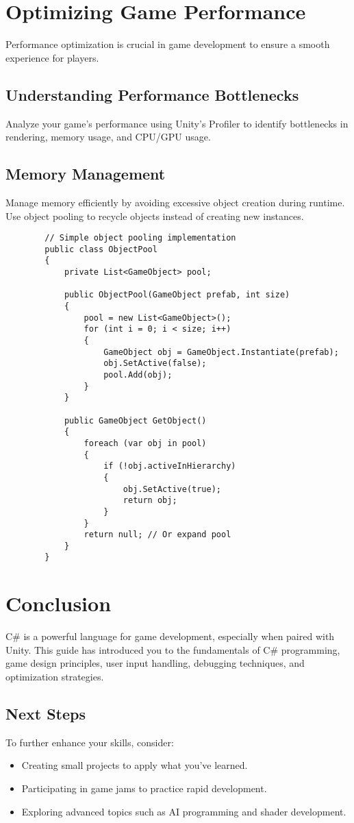 \documentclass[a4paper,12pt]{book}
\begin{document}
	\chapter{Optimizing Game Performance}
	Performance optimization is crucial in game development to ensure a smooth experience for players. 
	
	\section{Understanding Performance Bottlenecks}
	Analyze your game's performance using Unity's Profiler to identify bottlenecks in rendering, memory usage, and CPU/GPU usage.
	
	\section{Memory Management}
	Manage memory efficiently by avoiding excessive object creation during runtime. Use object pooling to recycle objects instead of creating new instances.
	
	\begin{lstlisting}
		// Simple object pooling implementation
		public class ObjectPool
		{
			private List<GameObject> pool;
			
			public ObjectPool(GameObject prefab, int size)
			{
				pool = new List<GameObject>();
				for (int i = 0; i < size; i++)
				{
					GameObject obj = GameObject.Instantiate(prefab);
					obj.SetActive(false);
					pool.Add(obj);
				}
			}
			
			public GameObject GetObject()
			{
				foreach (var obj in pool)
				{
					if (!obj.activeInHierarchy)
					{
						obj.SetActive(true);
						return obj;
					}
				}
				return null; // Or expand pool
			}
		}
	\end{lstlisting}
	
	\chapter{Conclusion}
	C\# is a powerful language for game development, especially when paired with Unity. This guide has introduced you to the fundamentals of C\# programming, game design principles, user input handling, debugging techniques, and optimization strategies. 
	
	\section{Next Steps}
	To further enhance your skills, consider:
	\begin{itemize}
		\item Creating small projects to apply what you've learned.
		\item Participating in game jams to practice rapid development.
		\item Exploring advanced topics such as AI programming and shader development.
	\end{itemize}
	
\end{document}
